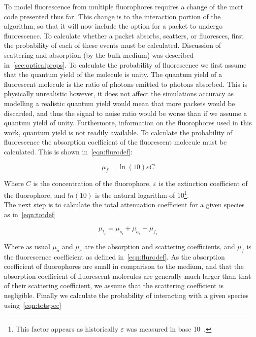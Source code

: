 To model fluorescence from multiple fluorophores requires a change of the \gls*{mcrt} code presented thus far.
This change is to the interaction portion of the algorithm, so that it will now include the option for a packet to undergo fluorescence.
To calculate whether a packet absorbs, scatters, or fluoresces, first the probability of each of these events must be calculated.
Discussion of scattering and absorption (by the bulk medium) was described in~\cref{sec:opticalprops}.
To calculate the probability of fluorescence we first assume that the quantum yield of the molecule is unity.
The quantum yield of a fluorescent molecule is the ratio of photons emitted to photons absorbed.
This is physically unrealistic however, it does not affect the simulations accuracy as modelling a realistic quantum yield would mean that more packets would be discarded, and thus the signal to noise ratio would be worse than if we assume a quantum yield of unity.
Furthermore, information on the fluorophores used in this work, quantum yield is not readily available.
To calculate the probability of fluorescence the absorption coefficient of the fluorescent molecule must be calculated.
This is shown in~\cref{eqn:flurodef}:

\begin{equation}
\mu_f=\ln\left(10\right)\varepsilon C
\label{eqn:flurodef}
\end{equation}

Where $C$ is the concentration of the fluorophore, $\varepsilon$ is the extinction coefficient of the fluorophore, and $ln(10)$ is the natural logarithm of 10\footnote{This factor appears as historically $\varepsilon$ was measured in base 10~\cite{jacques2013optical}.}.\\

The next step is to calculate the total attenuation coefficient for a given species as in~\cref{eqn:totdef}

\begin{equation}
\mu_{t_i}=\mu_{s_i}+\mu_{a_i}+\mu_{f_i}
\label{eqn:totdef}
\end{equation}

Where as usual $\mu_a$ and $\mu_s$ are the absorption and scattering coefficients, and $\mu_f$ is the fluorescence coefficient as defined in~\cref{eqn:flurodef}.
As the absorption coefficient of fluorophores are small in comparison to the medium, and that the absorption coefficient of fluorescent molecules are generally much larger than that of their scattering coefficient, we assume that the scattering coefficient is negligible.
Finally we calculate the probability of interacting with a given species using~\cref{eqn:totspec}

